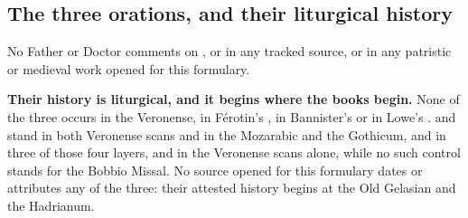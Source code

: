 \subsection*{The three orations, and their liturgical history}

No Father or Doctor comments on ,  or  in any tracked source, or in any patristic or
medieval work opened for this formulary.

\textbf{Their history is liturgical, and it begins where the books begin.} None of
the three occurs in the Veronense, in Férotin's , in Bannister's  or in Lowe's .  and  stand in both Veronense
scans and in the Mozarabic and the Gothicum,  and  in three of those four layers, and  in the Veronense
scans alone, while no such control stands for the Bobbio Missal. No source opened for this formulary dates or
attributes any of the three: their attested history begins at the Old Gelasian and
the Hadrianum.
